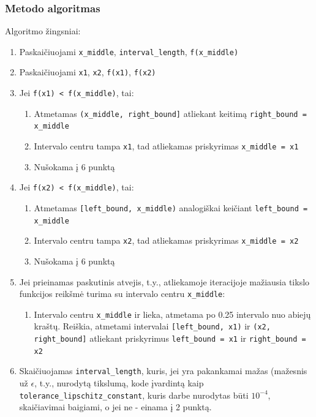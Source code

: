 \documentclass[lithuanian,a4paper,12pt]{article}
\newcommand{\mil}{\texttt}
\begin{document}
\subsubsection*{Metodo algoritmas}
Algoritmo žingsniai:
\begin{enumerate}
    \item Paskaičiuojami \mil{x_middle}, \mil{interval_length}, \mil{f(x_middle)}
    \item Paskaičiuojami \mil{x1}, \mil{x2}, \mil{f(x1)}, \mil{f(x2)}
    \item Jei \mil{f(x1) < f(x_middle)}, tai:
    \begin{enumerate}
        \item Atmetamas \mil{(x_middle, right_bound]} atliekant keitimą \mil{right_bound = x_middle}
        \item Intervalo centru tampa \mil{x1}, tad atliekamas priskyrimas \mil{x_middle = x1}
        \item Nušokama į 6 punktą
    \end{enumerate}
    \item Jei \mil{f(x2) < f(x_middle)}, tai:
    \begin{enumerate}
        \item Atmetamas \mil{[left_bound, x_middle)} analogiškai keičiant \mil{left_bound = x_middle}
        \item Intervalo centru tampa \mil{x2}, tad atliekamas priskyrimas \mil{x_middle = x2}
        \item Nušokama į 6 punktą
    \end{enumerate}
    \item Jei prieinamas paskutinis atvejis, t.y., atliekamoje iteracijoje mažiausia tikslo funkcijos reikšmė turima su intervalo centru \mil{x_middle}: 
    \begin{enumerate}
        \item Intervalo centru \mil{x_middle} ir lieka, atmetama po 0.25 intervalo nuo abiejų kraštų. Reiškia, atmetami intervalai \mil{[left_bound, x1)} ir \mil{(x2, right_bound]} atliekant priskyrimus \mil{left_bound = x1} ir \mil{right_bound = x2}
    \end{enumerate}
    \item Skaičiuojamas \mil{interval_length}, kuris, jei yra pakankamai mažas (mažesnis už 
    $\epsilon$, t.y., nurodytą tikslumą, kode įvardintą kaip \mil{tolerance_lipschitz_constant}, kuris darbe nurodytas būti $10^{-4}$, skaičiavimai baigiami, o jei ne - einama į 2 punktą. 
\end{enumerate}
\end{document}

